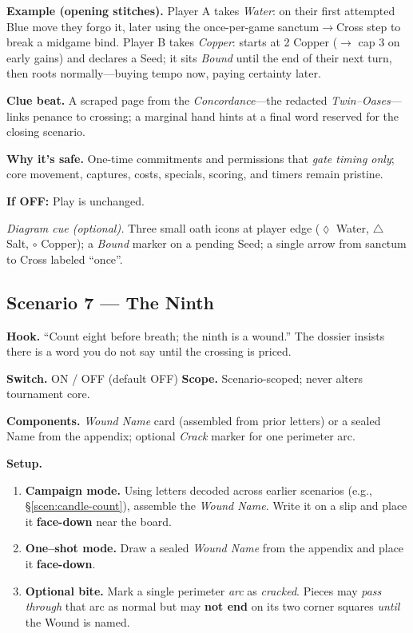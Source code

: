\documentclass[11pt]{article}
\begin{document}
\medskip
\noindent\textbf{Example (opening stitches).}  
Player A takes \textit{Water}: on their first attempted Blue move they forgo it, later using the once-per-game sanctum\(\to\)Cross step to break a midgame bind.  
Player B takes \textit{Copper}: starts at 2 Copper (\( \to \) cap 3 on early gains) and declares a Seed; it sits \emph{Bound} until the end of their next turn, then roots normally—buying tempo now, paying certainty later.

\medskip
\noindent\textbf{Clue beat.} A scraped page from the \emph{Concordance}—the redacted \emph{Twin–Oases}—links penance to crossing; a marginal hand hints at a final word reserved for the closing scenario.

\medskip
\noindent\textbf{Why it’s safe.} One-time commitments and permissions that \emph{gate timing only}; core movement, captures, costs, specials, scoring, and timers remain pristine.

\medskip
\noindent\textbf{If \textsc{OFF}:} Play is unchanged.

\medskip
\noindent\textit{Diagram cue (optional).} Three small oath icons at player edge (\(\lozenge\) Water, \(\triangle\) Salt, \(\circ\) Copper); a \emph{Bound} marker on a pending Seed; a single arrow from sanctum to Cross labeled “once”.

\subsection{Scenario 7 — The Ninth}
\label{scen:the-ninth}

\noindent\textbf{Hook.} “Count eight before breath; the ninth is a wound.” The dossier insists there is a word you do not say until the crossing is priced.

\medskip
\noindent\textbf{Switch.} \textsc{ON / OFF} (default \textsc{OFF}) \hfill \textbf{Scope.} Scenario-scoped; never alters tournament core.

\medskip
\noindent\textbf{Components.} \emph{Wound Name} card (assembled from prior letters) or a sealed Name from the appendix; optional \emph{Crack} marker for one perimeter arc.

\medskip
\noindent\textbf{Setup.}
\begin{enumerate}\setlength\itemsep{0.2em}
  \item \textbf{Campaign mode.} Using letters decoded across earlier scenarios (e.g., \S\ref{scen:candle-count}), assemble the \emph{Wound Name}. Write it on a slip and place it \textbf{face-down} near the board.
  \item \textbf{One–shot mode.} Draw a sealed \emph{Wound Name} from the appendix and place it \textbf{face-down}.
  \item \textbf{Optional bite.} Mark a single perimeter \emph{arc} as \emph{cracked}. Pieces may \emph{pass through} that arc as normal but may \textbf{not end} on its two corner squares \textit{until} the Wound is named.
\end{enumerate}
\end{document}
